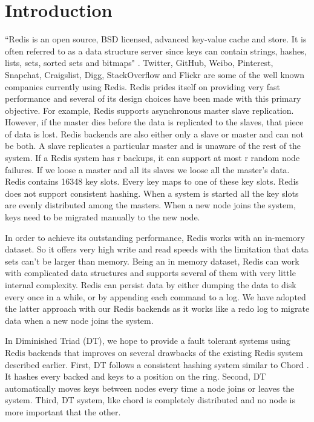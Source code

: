 \documentclass[10pt,twocolumn,letterpaper]{article}
\begin{document}
\section{Introduction}
``Redis is an open source, BSD licensed, advanced key-value cache and store. It is often referred to as a data structure server since keys can contain strings, hashes, lists, sets, sorted sets and bitmaps"\cite{intro} . Twitter, GitHub, Weibo, Pinterest, Snapchat, Craigslist, Digg, StackOverflow and Flickr are some of the well known companies currently using Redis. Redis prides itself on providing very fast performance and several of its design choices have been made with this primary objective. For example, Redis supports asynchronous master slave replication. However, if the master dies before the data is replicated to the slaves, that piece of data is lost. Redis backends are also either only a slave or master and can not be both. A slave replicates a particular master and is unaware of the rest of the system. If a Redis system has r backups, it can support at most r random node failures. If we loose a master and all its slaves we loose all the master's data. Redis contains 16348 key slots. Every key maps to one of these key slots. Redis does not support consistent hashing. When a system is started all the key slots are evenly distributed among the masters.  When a new node joins the system, keys need to be migrated manually to the new node.

In order to achieve its outstanding performance, Redis works with an in-memory dataset. So it offers very high write and read speeds with the limitation that data sets can't be larger than memory. Being an in memory dataset, Redis can work with complicated data structures and supports several of them with very little internal complexity. Redis can persist data by either dumping the data to disk every once in a while, or by appending each command to a log. We have adopted the latter approach with our Redis backends as it works like a redo log to migrate data when a new node joins the system. 

In Diminished Triad (DT), we hope to provide a fault tolerant systems using Redis backends that improves on several drawbacks of the existing Redis system described earlier. First,  DT follows a consistent hashing system similar to Chord \cite{chord}. It hashes every backed and keys to a position on the ring. Second, DT automatically moves keys between nodes every time a node joins or leaves the system. Third, DT system, like chord is completely distributed and no node is more important that the other. 
\end{document}
